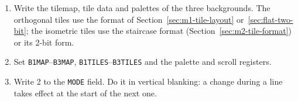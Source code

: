 \begin{enumerate}
	\item Write the tilemap, tile data and palettes of the three backgrounds. The orthogonal tiles use the format of
	      Section~\ref{sec:m1-tile-layout} or~\ref{sec:flat-two-bit}; the isometric tiles use the staircase format
	      (Section~\ref{sec:m2-tile-format}) or its 2-bit form.
	\item Set \texttt{B1MAP}--\texttt{B3MAP}, \texttt{B1TILES}--\texttt{B3TILES} and the palette and scroll registers.
	\item Write 2 to the \texttt{MODE} field. Do it in vertical blanking: a change during a line takes effect at the start of the
	      next one.
\end{enumerate}
